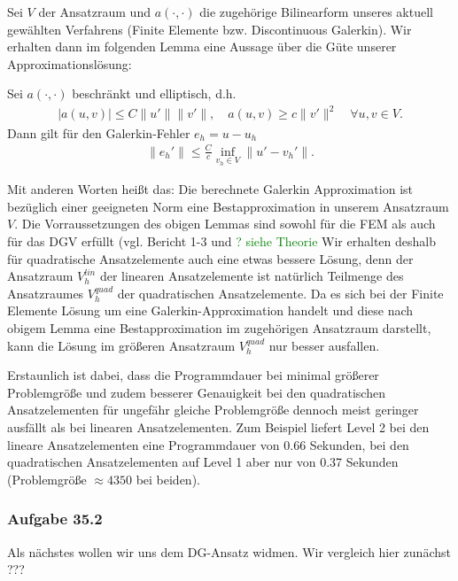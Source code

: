 Sei $V$ der Ansatzraum und $a(\cdot,\cdot)$ die zugehörige Bilinearform unseres aktuell gewählten Verfahrens (Finite Elemente bzw. Discontinuous Galerkin).
Wir erhalten dann im folgenden Lemma eine Aussage über die Güte unserer Approximationslösung:

\begin{Lemma}
  Sei $a(\cdot,\cdot)$ beschränkt und elliptisch, d.h.
  \begin{align*}
    |a(u,v)| \le C \|u'\| \|v'\|, \quad a(u,v) \ge c \| v'\|^2
    \quad \forall u,v \in V.
  \end{align*}
  Dann gilt für den Galerkin-Fehler $e_h = u-u_h$
  \begin{align*}
    \| e_h' \| \le \frac{C}{c} \inf\limits_{v_h \in V}
    \| u'-v_h' \|.
  \end{align*}
\end{Lemma}
Mit anderen Worten heißt das: Die berechnete Galerkin Approximation ist bezüglich einer geeigneten Norm eine Bestapproximation in unserem Ansatzraum $V$.
Die Vorraussetzungen des obigen Lemmas sind sowohl für die FEM als auch für das DGV erfüllt (vgl. Bericht 1-3 und
\textcolor{green}{ ? siehe Theorie }
Wir erhalten deshalb für quadratische Ansatzelemente auch eine etwas bessere Lösung, denn der Ansatzraum $V_h^{lin}$ der linearen Ansatzelemente ist natürlich Teilmenge des Ansatzraumes $V_h^{quad}$ der quadratischen Ansatzelemente. Da es sich bei der Finite Elemente Lösung um eine Galerkin-Approximation handelt und diese nach obigem Lemma eine Bestapproximation im zugehörigen Ansatzraum darstellt, kann die Lösung im größeren Ansatzraum $V_h^{quad}$ nur besser ausfallen.

Erstaunlich ist dabei, dass die Programmdauer bei minimal größerer Problemgröße und zudem besserer Genauigkeit bei den quadratischen Ansatzelementen für ungefähr gleiche Problemgröße dennoch meist geringer ausfällt als bei linearen Ansatzelementen. Zum Beispiel liefert Level 2 bei den lineare Ansatzelementen eine Programmdauer von 0.66 Sekunden, bei den quadratischen Ansatzelementen auf Level 1 aber nur von 0.37 Sekunden (Problemgröße $\approx 4350$ bei beiden).



\subsubsection{Aufgabe 35.2}
Als nächstes wollen wir uns dem DG-Ansatz widmen. Wir vergleich hier zunächst ???
\begin{figure}[H]
	\centering
\end{figure}

